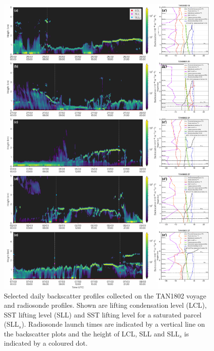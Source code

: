\begin{figure}[t]
\centering
\includegraphics[width=\textwidth]{chapter4/fig/backscatter_rs.pdf}
\caption[Selected daily backscatter profiles collected on the TAN1802 voyage
and radiosonde profiles]{Selected daily backscatter profiles collected on the TAN1802 voyage
and radiosonde profiles. Shown are lifting condensation level (LCL),
SST lifting level (SLL) and SST lifting level for a saturated parcel (SLL$_s$).
Radiosonde launch times are indicated by a vertical line on the backscatter
plots and the height of LCL, SLL and SLL$_s$ is indicated by a coloured dot.
}
\label{fig:backscatter-rs}
\end{figure}

\clearpage

